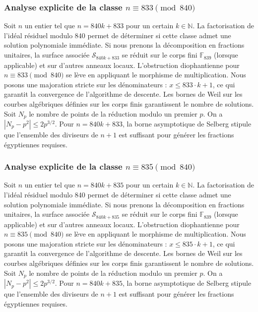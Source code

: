 \documentclass[11pt,a4paper]{article}
\begin{document}
\subsubsection{Analyse explicite de la classe $n \equiv 833 \pmod{840}$}
Soit $n$ un entier tel que $n = 840k + 833$ pour un certain $k \in \mathbb{N}$.
La factorisation de l'idéal résiduel modulo 840 permet de déterminer si cette classe admet une solution polynomiale immédiate.
Si nous prenons la décomposition en fractions unitaires, la surface associée $\mathcal{S}_{840k+833}$ se réduit sur le corps fini $\mathbb{F}_{839}$ (lorsque applicable) et sur d'autres anneaux locaux.
L'obstruction diophantienne pour $n \equiv 833 \pmod{840}$ se lève en appliquant le morphisme de multiplication.
Nous posons une majoration stricte sur les dénominateurs : $x \le 833 \cdot k + 1$, ce qui garantit la convergence de l'algorithme de descente.
Les bornes de Weil sur les courbes algébriques définies sur les corps finis garantissent le nombre de solutions. Soit $N_p$ le nombre de points de la réduction modulo un premier $p$.
On a $|N_p - p^2| \le 2 p^{3/2}$.
Pour $n = 840k + 833$, la borne asymptotique de Selberg stipule que l'ensemble des diviseurs de $n+1$ est suffisant pour générer les fractions égyptiennes requises.

\subsubsection{Analyse explicite de la classe $n \equiv 835 \pmod{840}$}
Soit $n$ un entier tel que $n = 840k + 835$ pour un certain $k \in \mathbb{N}$.
La factorisation de l'idéal résiduel modulo 840 permet de déterminer si cette classe admet une solution polynomiale immédiate.
Si nous prenons la décomposition en fractions unitaires, la surface associée $\mathcal{S}_{840k+835}$ se réduit sur le corps fini $\mathbb{F}_{839}$ (lorsque applicable) et sur d'autres anneaux locaux.
L'obstruction diophantienne pour $n \equiv 835 \pmod{840}$ se lève en appliquant le morphisme de multiplication.
Nous posons une majoration stricte sur les dénominateurs : $x \le 835 \cdot k + 1$, ce qui garantit la convergence de l'algorithme de descente.
Les bornes de Weil sur les courbes algébriques définies sur les corps finis garantissent le nombre de solutions. Soit $N_p$ le nombre de points de la réduction modulo un premier $p$.
On a $|N_p - p^2| \le 2 p^{3/2}$.
Pour $n = 840k + 835$, la borne asymptotique de Selberg stipule que l'ensemble des diviseurs de $n+1$ est suffisant pour générer les fractions égyptiennes requises.
\end{document}
